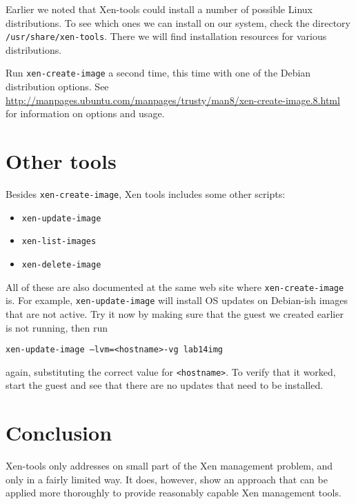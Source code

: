 \documentclass{article}
\begin{document}
Earlier we noted that Xen-tools could install a number of possible Linux distributions. To see which ones we can install on our system, check the directory \texttt{/usr/share/xen-tools}. There we will find installation resources for various 
distributions.

Run \texttt{xen-create-image} a second time, this time with one of the Debian distribution options. See 
\url{http://manpages.ubuntu.com/manpages/trusty/man8/xen-create-image.8.html} for information on 
options and usage.

\section{Other tools}
Besides \texttt{xen-create-image}, Xen tools includes some other scripts:

\begin{itemize}
  \item \texttt{xen-update-image}
  \item \texttt{xen-list-images}
  \item \texttt{xen-delete-image}
 \end{itemize}
 
 All of these are also documented at the same web site where \texttt{xen-create-image} is. For example, 
 \texttt{xen-update-image} will install OS updates on Debian-ish images that are not active. Try it now by 
 making sure that the guest we created earlier is not running, then run
 
 \texttt{xen-update-image --lvm=<hostname>-vg lab14img}
 
 again, substituting the correct value for \texttt{<hostname>}. To verify that it worked, start the guest and see 
 that there are no updates that need to be installed.
 
 \section{Conclusion}
 Xen-tools only addresses on small part of the Xen management problem, and only in a fairly limited way. It does, however, show an approach that can be applied more thoroughly to provide reasonably capable Xen management tools.
 
 
\end{document}
